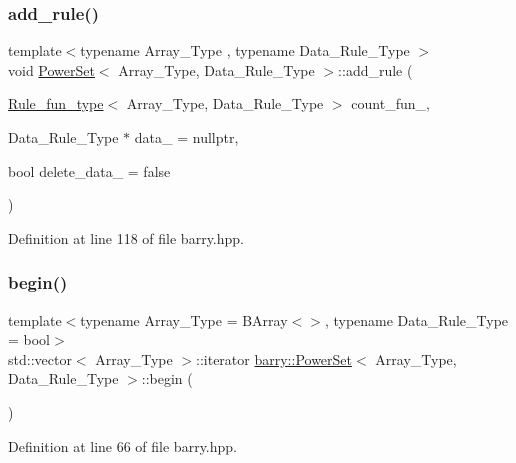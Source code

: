 \subsubsection{\texorpdfstring{add\+\_\+rule()}{add\_rule()}\hspace{0.1cm}{\footnotesize\ttfamily [3/3]}}
{\footnotesize\ttfamily template$<$typename Array\+\_\+\+Type , typename Data\+\_\+\+Rule\+\_\+\+Type $>$ \\
void \hyperlink{classbarry_1_1_power_set}{Power\+Set}$<$ Array\+\_\+\+Type, Data\+\_\+\+Rule\+\_\+\+Type $>$\+::add\+\_\+rule (\begin{DoxyParamCaption}\item[{\hyperlink{namespacebarry_aefd7e6d4ba228e2ce1074d075c512178}{Rule\+\_\+fun\+\_\+type}$<$ Array\+\_\+\+Type, Data\+\_\+\+Rule\+\_\+\+Type $>$}]{count\+\_\+fun\+\_\+,  }\item[{Data\+\_\+\+Rule\+\_\+\+Type $\ast$}]{data\+\_\+ = {\ttfamily nullptr},  }\item[{bool}]{delete\+\_\+data\+\_\+ = {\ttfamily false} }\end{DoxyParamCaption})\hspace{0.3cm}{\ttfamily [inline]}}



Definition at line 118 of file barry.\+hpp.

\mbox{\label{classbarry_1_1_power_set_a0db34800ac228a47917cc9f3e08a88a9}} 
\subsubsection{\texorpdfstring{begin()}{begin()}}
{\footnotesize\ttfamily template$<$typename Array\+\_\+\+Type  = B\+Array$<$$>$, typename Data\+\_\+\+Rule\+\_\+\+Type  = bool$>$ \\
std\+::vector$<$ Array\+\_\+\+Type $>$\+::iterator \hyperlink{classbarry_1_1_power_set}{barry\+::\+Power\+Set}$<$ Array\+\_\+\+Type, Data\+\_\+\+Rule\+\_\+\+Type $>$\+::begin (\begin{DoxyParamCaption}{ }\end{DoxyParamCaption})\hspace{0.3cm}{\ttfamily [inline]}}



Definition at line 66 of file barry.\+hpp.

